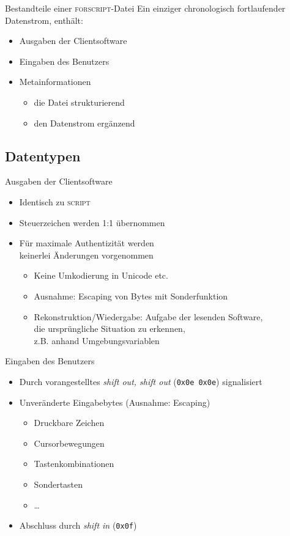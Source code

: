 \documentclass[ignorenonframetext,ucs]{beamer}
\def\cmd{\textsc}
\begin{document}
\begin{frame}{Bestandteile einer \cmd{forscript}-Datei}
Ein einziger chronologisch fortlaufender Datenstrom, enthält:
\begin{itemize}
\item Ausgaben der Clientsoftware
\item Eingaben des Benutzers
\item Metainformationen\begin{itemize}
\item die Datei strukturierend
\item den Datenstrom ergänzend\end{itemize}
\end{itemize}
\end{frame}

\subsection{Datentypen}

\begin{frame}{Ausgaben der Clientsoftware}
\begin{itemize}
\item Identisch zu \cmd{script}
\item Steuerzeichen werden 1:1 übernommen
\item Für maximale Authentizität werden \\ keinerlei Änderungen vorgenommen\begin{itemize}
\item Keine Umkodierung in Unicode etc.
\item Ausnahme: Escaping von Bytes mit Sonderfunktion
\item Rekonstruktion/Wiedergabe: Aufgabe der lesenden Software, \\ die ursprüngliche Situation zu erkennen, \\ z.B. anhand Umgebungsvariablen\end{itemize}
\end{itemize}
\end{frame}

\begin{frame}{Eingaben des Benutzers}
\begin{itemize}
\item Durch vorangestelltes \emph{shift out, shift out} (\texttt{0x0e 0x0e}) signalisiert
\item Unveränderte Eingabebytes (Ausnahme: Escaping)\begin{itemize}
\item Druckbare Zeichen
\item Cursorbewegungen
\item Tastenkombinationen
\item Sondertasten
\item …\end{itemize}
\item Abschluss durch \emph{shift in} (\texttt{0x0f})
\end{itemize}
\end{frame}
\end{document}
